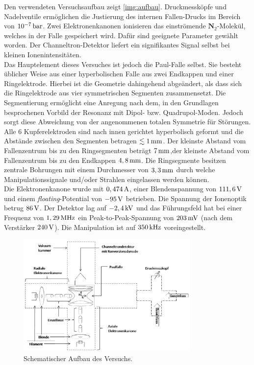 \documentclass[numbers=noenddot,a4paper,notitlepage,twoside,BCOR15mm]{scrartcl}
\newcommand{\tenpo}[1]{ 10^{#1}}
\newcommand{\tilt}[1]{\textit{#1}}
\newcommand{\fett}[1]{\textbf{#1}}
\begin{document}
		Den verwendeten Versuchsaufbau zeigt \autoref{img:aufbau}. Druckmessköpfe und Nadelventile ermöglichen die Justierung des internen Fallen-Drucks im Bereich von $\unit[\tenpo{-7}]{bar}$. Zwei Elektronenkanonen ionisieren das einströmende $\fett{N}_2$-Molekül, welches in der Falle gespeichert wird. Dafür sind geeignete Parameter gewählt worden. Der Channeltron-Detektor liefert ein signifikantes Signal selbst bei kleinen Ionenintensitäten.\\
		Das Hauptelement dieses Versuches ist jedoch die Paul-Falle selbst. Sie besteht üblicher Weise aus einer hyperbolischen Falle aus zwei Endkappen und einer Ringelektrode. Hierbei ist die Geometrie dahingehend abgeändert, als dass sich die Ringelektrode aus vier symmetrischen Segmenten zusammensetzt. Die Segmentierung ermöglicht eine Anregung nach dem, in den Grundlagen besprochenen Vorbild der Resonanz mit Dipol- bzw. Quadrupol-Moden. Jedoch sorgt diese Abweichung von der angenommenen totalen Symmetrie für Störungen.\\
		Alle 6 Kupferelektroden sind nach innen gerichtet hyperbolisch geformt und die Abstände zwischen den Segmenten betragen $\lesssim\unit[1]{mm}$. Der kleinste Abstand vom Fallenzentrum bis zu den Ringsegmenten beträgt $\unit[7]{mm}$,der kleinste Abstand vom Fallenzentrum bis zu den Endkappen $\unit[4,8]{mm}$. Die Ringsegmente besitzen zentrale Bohrungen mit einem Durchmesser von $\unit[3,3]{mm}$ durch welche Manipulationssignale und/oder Strahlen eingelassen werden können.\\
		Die Elektronenkanone wurde mit $\unit[0,474]{A}$, einer Blendenspannung von $\unit[111,6]{V}$ und einem \tilt{floating}-Potential von $\unit[-95]{V}$ betrieben. Die Spannung der Ionenoptik betrug $\unit[86]{V}$. Der Detektor lag auf $\unit[-2,4]{kV}$ und das Führungsfeld hat bei einer Frequenz von $\unit[1,29]{MHz}$ ein Peak-to-Peak-Spannung von $\unit[203]{mV}$ (nach dem Verstärker $\unit[240]{V}$). Die Manipulation ist auf $\unit[350]{kHz}$ voreingestellt.

			\begin{figure}
				\centering
				\includegraphics[width=0.8\textwidth]{aufbau.png}
				\caption{Schematischer Aufbau des Versuchs. \cite{EMAUGreifswaldPaul}}\label{img:aufbau}
			\end{figure}
\end{document}
